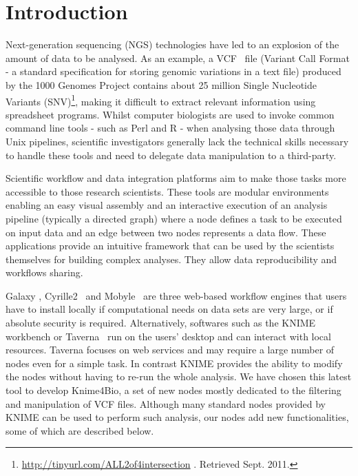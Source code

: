 \documentclass{bioinfo}
\begin{document}
\section{Introduction}

Next-generation sequencing (NGS) technologies have led to an explosion of the amount of data to be analysed. As an example, a VCF~\citep{pmid21653522} file (Variant Call Format - a standard specification for storing genomic variations in a text file) produced by the 1000 Genomes Project contains about 25 million Single Nucleotide Variants (SNV)\footnote{\href{ftp://ftp-trace.ncbi.nih.gov/1000genomes/ftp/release/20100804/ALL.2of4intersection.20100804.sites.vcf.gz}{http://tinyurl.com/ALL2of4intersection} . Retrieved Sept. 2011.}, making it difficult to extract relevant information using spreadsheet programs. Whilst computer biologists are used to invoke common command line tools - such as Perl and R - when analysing those data through Unix pipelines, scientific investigators generally lack the technical skills necessary to handle these tools and need to delegate data manipulation to a third-party. 

Scientific workflow and data integration platforms aim to make those tasks more accessible to those research scientists. These tools are modular environments enabling an easy visual assembly and an interactive execution of an analysis pipeline (typically a directed graph) where a node defines a task to be executed on input data and an edge between two nodes represents a data flow. These applications provide an intuitive framework that can be used by the scientists themselves for building complex analyses. They allow data reproducibility and workflows sharing.

Galaxy \citep{pmid21531983}, Cyrille2~\citep{pmid18269742} and Mobyle~\citep{pmid19689959} are three web-based workflow engines that users have to install locally if computational needs on data sets are very large, or if absolute security is required. Alternatively, softwares such as the KNIME~\citep{knimeref} workbench or Taverna~\citep{pmid16845108}  run on the users' desktop and can interact with local resources. Taverna focuses on web services and may require a large number of nodes even for a simple task. In contrast KNIME provides the ability to modify the nodes without having to re-run the whole analysis. We have chosen this latest tool to develop Knime4Bio, a set of new nodes mostly dedicated to the filtering and manipulation of VCF files. Although many standard nodes provided by KNIME can be used to perform such analysis, our nodes add new functionalities, some of which are described below.
\end{document}
